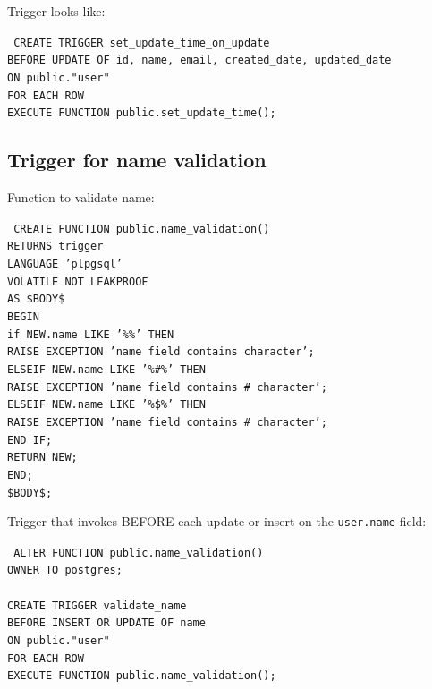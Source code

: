 Trigger looks like:

\texttt{
    CREATE TRIGGER set\_update\_time\_on\_update \\
    BEFORE UPDATE OF id, name, email, created\_date, updated\_date \\
    ON public."user" \\
    FOR EACH ROW \\
    EXECUTE FUNCTION public.set\_update\_time(); \\
}

\subsection{Trigger for name validation}\label{subsec:trigger-name-validation}

Function to validate name:

\texttt{
    CREATE FUNCTION public.name\_validation()\\
    RETURNS trigger\\
    LANGUAGE 'plpgsql'\\
    VOLATILE NOT LEAKPROOF\\
    AS \$BODY\$\\
    BEGIN\\
    if NEW.name LIKE '\%\@\%' THEN\\
        RAISE EXCEPTION 'name field contains \@ character';\\
    ELSEIF NEW.name LIKE '\%\#\%' THEN\\
        RAISE EXCEPTION 'name field contains \# character';\\
    ELSEIF NEW.name LIKE '\%\$\%' THEN\\
        RAISE EXCEPTION 'name field contains \# character';\\
    END IF;\\
    RETURN NEW;\\
    END;\\
    \$BODY\$;\\
}

Trigger that invokes BEFORE each update or insert on the \texttt{user.name} field:

\texttt{
    ALTER FUNCTION public.name\_validation() \\
    OWNER TO postgres; \\
    \\
    CREATE TRIGGER validate\_name \\
    BEFORE INSERT OR UPDATE OF name \\
    ON public."user" \\
    FOR EACH ROW \\
    EXECUTE FUNCTION public.name\_validation(); \\
}

